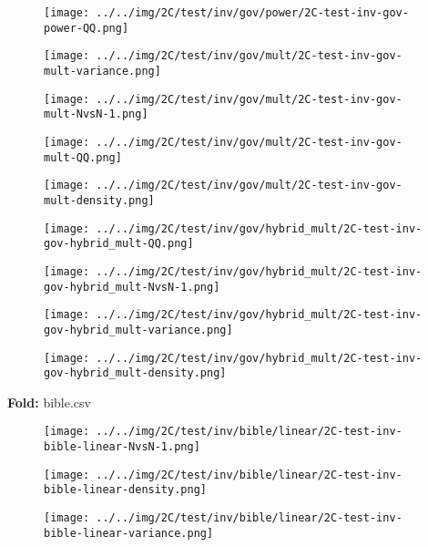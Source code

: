\begin{figure}[H]
\centering	\texttt{[image: ../../img/2C/test/inv/gov/power/2C-test-inv-gov-power-QQ.png]}
\end{figure}
\begin{figure}[H]
\centering	\texttt{[image: ../../img/2C/test/inv/gov/mult/2C-test-inv-gov-mult-variance.png]}
\end{figure}
\begin{figure}[H]
\centering	\texttt{[image: ../../img/2C/test/inv/gov/mult/2C-test-inv-gov-mult-NvsN-1.png]}
\end{figure}
\begin{figure}[H]
\centering	\texttt{[image: ../../img/2C/test/inv/gov/mult/2C-test-inv-gov-mult-QQ.png]}
\end{figure}
\begin{figure}[H]
\centering	\texttt{[image: ../../img/2C/test/inv/gov/mult/2C-test-inv-gov-mult-density.png]}
\end{figure}
\begin{figure}[H]
\centering	\texttt{[image: ../../img/2C/test/inv/gov/hybrid\_mult/2C-test-inv-gov-hybrid\_mult-QQ.png]}
\end{figure}
\begin{figure}[H]
\centering	\texttt{[image: ../../img/2C/test/inv/gov/hybrid\_mult/2C-test-inv-gov-hybrid\_mult-NvsN-1.png]}
\end{figure}
\begin{figure}[H]
\centering	\texttt{[image: ../../img/2C/test/inv/gov/hybrid\_mult/2C-test-inv-gov-hybrid\_mult-variance.png]}
\end{figure}
\begin{figure}[H]
\centering	\texttt{[image: ../../img/2C/test/inv/gov/hybrid\_mult/2C-test-inv-gov-hybrid\_mult-density.png]}
\end{figure}
\textbf{Fold:} bible.csv
\begin{figure}[H]
\centering	\texttt{[image: ../../img/2C/test/inv/bible/linear/2C-test-inv-bible-linear-NvsN-1.png]}
\end{figure}
\begin{figure}[H]
\centering	\texttt{[image: ../../img/2C/test/inv/bible/linear/2C-test-inv-bible-linear-density.png]}
\end{figure}
\begin{figure}[H]
\centering	\texttt{[image: ../../img/2C/test/inv/bible/linear/2C-test-inv-bible-linear-variance.png]}
\end{figure}
